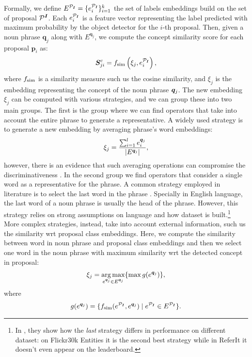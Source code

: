 Formally, we define $E^{\mathcal{P}_{\bm{I}}} = \{e^{\mathcal{P}_{\bm{I}}}_i \}^{k}_{i=1}$ the set of labels
embeddings build on the set of proposal $\mathcal{P}^{\bm{I}}$. Each
$e^{\mathcal{P}_{\bm{I}}}_i$ is a feature vector representing the label predicted with
maximum probability by the object detector for the $i$-th proposal.
Then, given a noun phrase $\bm{q}_j$ along with $E^{\bm{q}_j}$, we
compute the concept similarity score for each proposal $\bm{p}_i$ as:
\begin{equation}
  \bm{S}^c_{ji} = f_{\text{sim}} \left( \xi_j, e^{\mathcal{P}_{\bm{I}}}_i \right),
\end{equation}
where $f_{\text{sim}}$ is a similarity measure such us the cosine similarity,
and $\xi_j$ is the embedding representing the concept of the noun
phrase $\bm{q}_j$. The new embedding $\xi_j$ can be computed with various
strategies, and we can group these into two main groups. The first is
the group where we can find operators that take into account the
entire phrase to generate a representative. A widely used strategy is
to generate a new embedding by averaging phrase's word embeddings:
\begin{equation}
  \xi_j = \frac{\sum^l_{i=1} e^{\bm{q}_j}_i}{| E^{\bm{q}_j} |},
\end{equation}
however, there is an evidence that such averaging operations can
compromise the discriminativeness
\cite{wang2019phrase,datta2019align2ground}. In the second group we
find operators that consider a single word as a representative for the
phrase. A common strategy employed in literature is to select the last
word in the phrase \cite{wang2019phrase}. Specially in English
language, the last word of a noun phrase is usually the head of the
phrase. However, this strategy relies on strong assumptions on
language and how dataset is built.\footnote{In \cite{wang2019phrase},
they show how the \textit{last} strategy differs in performance on
different dataset: on Flickr30k Entities it is the second best
strategy while in ReferIt it doesn't even appear on the leaderboard.}
More complex strategies, instead, take into account external
information, such us the similarity wrt proposal class embeddings.
Here, we compute the similarity between word in noun phrase and
proposal class embeddings and then we select one word in the noun
phrase with maximum similarity wrt the detected concept in proposal:
\begin{equation}
  \xi_j = \operatorname*{arg\,max}_{e^{\bm{q}_j} \in E^{\bm{q}_j}} \{ \max g(e^{\bm{q}_j}) \},
  \label{eq:concept-embedding-max-sim}
\end{equation}
where
\begin{equation}
  g(e^{\bm{q}_j}) = \{ f_{\text{sim}}(e^{\mathcal{P}_{\bm{I}}}, e^{\bm{q}_j}) \mid e^{\mathcal{P}_{\bm{I}}} \in E^{\mathcal{P}_{\bm{I}}} \}.
\end{equation}
